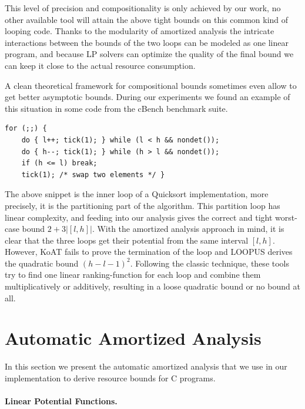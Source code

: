 \documentclass[nocopyrightspace,preprint,pldi]{sigplanconf-pldi15}
\newcommand{\ifshort}[2]{\ifx\fullversion\undefined{#1}\else{#2}\fi}
\newcommand{\sectskip}[0]{\ifshort{\vspace{-3pt}}{}}
\newcommand{\aftersectskip}[0]{\ifshort{\vspace{-1pt}}{}}
\begin{document}
This level of precision and compositionality is only achieved by
our work, no other available tool will attain the above tight bounds
on this common kind of looping code.  Thanks to the modularity of
amortized analysis the intricate interactions between the bounds of
the two loops can be modeled as one linear program, and because LP
solvers can optimize the quality of the final bound we can keep
it close to the actual resource consumption.

A clean theoretical framework for compositional bounds sometimes
even allow to get better asymptotic bounds.  During our experiments
we found an example of this situation in some code from the cBench
benchmark suite.
%
\begin{lstlisting}
for (;;) {
    do { l++; tick(1); } while (l < h && nondet());
    do { h--; tick(1); } while (h > l && nondet());
    if (h <= l) break;
    tick(1); /* swap two elements */ }
\end{lstlisting}
%
The above snippet is the inner loop of a Quicksort implementation, more
precisely, it is the partitioning part of the algorithm.  This partition
loop has linear complexity, and feeding into our analysis gives the
correct and tight worst-case bound $2+3|[l,h]|$.  With the amortized
analysis approach in mind, it is clear that the three loops get their
potential from the same interval $[l,h]$.  However, KoAT fails to
prove the termination of the loop and LOOPUS derives the quadratic bound
$(h-l-1)^2$.  Following the classic technique, these tools try to find one
linear ranking-function for each loop and combine them multiplicatively
or additively, resulting in a loose quadratic bound or no bound at all.

\sectskip
\section{Automatic Amortized Analysis}
\label{sec:AAA}
\aftersectskip

In this section we present the automatic amortized analysis that we
use in our implementation to derive resource bounds for C
programs.

\paragraph{Linear Potential Functions.}
\end{document}
